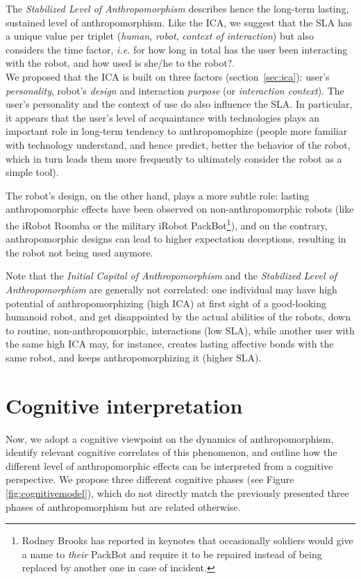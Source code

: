 \documentclass{sig-alternate-2013}
\begin{document}
The \emph{Stabilized Level of Anthropomorphism} describes hence the long-term 
lasting, sustained level of anthropomorphism. Like the ICA, we suggest that
the SLA has a unique value per triplet
(\emph{human}, \emph{robot}, \emph{context of interaction}) but also considers
the time factor, \emph{i.e.} for how long in total has the user been interacting
with the robot, and how used is she/he to the robot?.\\

We proposed that the ICA is built on three factors (section~\ref{sec:ica}):
user's \emph{personality}, robot's \emph{design} and interaction \emph{purpose}
(or \emph{interaction context}). The user's personality and the context of use
do also influence the SLA. In particular, it appears that the user's level of
acquaintance with technologies plays an important role in long-term tendency to
anthropomophize (people more familiar with technology understand, and hence
predict, better the behavior of the robot, which in turn leads them more
frequently to ultimately consider the robot as a simple tool).

The robot's design, on the other hand, plays a more subtle role: lasting
anthropomorphic effects have been observed on non-anthropomorphic robots (like
the iRobot Roomba or the military iRobot PackBot\footnote{Rodney Brooks has
reported in keynotes that occasionally soldiers would give a name to
\emph{their} PackBot and require it to be repaired instead of being replaced by
another one in case of incident.}), and on the contrary, anthropomorphic
designs can lead to higher expectation deceptions, resulting in the robot not
being used anymore.

Note that the \emph{Initial Capital of Anthropomorphism} and the
\emph{Stabilized Level of Anthropomorphism} are generally not correlated: one
individual may have high potential of anthropomorphizing (high ICA) at first
sight of a good-looking humanoid robot, and get disappointed by the actual
abilities of the robots, down to routine, non-anthropomorphic, interactions
(low SLA), while another user with the same high ICA may, for instance, creates
lasting affective bonds with the same robot, and keeps anthropomorphizing it
(higher SLA).


\section{Cognitive interpretation}
\label{sec:cognitivemodel}

Now, we adopt a cognitive viewpoint on the dynamics of anthropomorphism,
identify relevant cognitive correlates of this phenomenon, and outline how the different level of anthropomorphic effects can be interpreted from a cognitive perspective. We propose three different cognitive phases (see Figure \ref{fig:cognitivemodel}), which do not directly
match the previously presented three phases of anthropomorphism but are related
otherwise.
\end{document}
